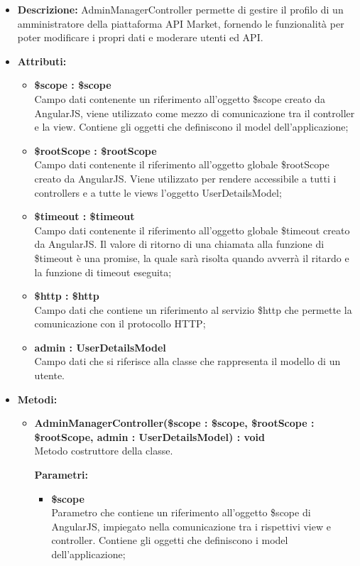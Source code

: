 \begin{itemize}
	\item \textbf{Descrizione:} AdminManagerController permette di gestire il profilo di un amministratore della piattaforma API Market, fornendo le funzionalità per poter modificare i propri dati e moderare utenti ed API.
	\item \textbf{Attributi:}
		\begin{itemize}
		
			\item \textbf{\$scope : \$scope}\\
			Campo dati contenente un riferimento all'oggetto \$scope creato da AngularJS, viene utilizzato come mezzo di comunicazione tra il controller e la view. Contiene gli oggetti che definiscono il model dell'applicazione;
			
			\item \textbf{\$rootScope : \$rootScope}\\
			Campo dati contenente il riferimento all'oggetto globale \$rootScope creato da AngularJS. Viene utilizzato per rendere accessibile a tutti i controllers e a tutte le views l'oggetto UserDetailsModel;
			
			\item \textbf{\$timeout : \$timeout }\\
			Campo dati contenente il riferimento all'oggetto globale \$timeout creato da AngularJS. Il valore di ritorno di una chiamata alla funzione di \$timeout è una promise, la quale sarà risolta quando avverrà il ritardo e la funzione di timeout eseguita;

			\item \textbf{\$http : \$http }\\
			Campo dati che contiene un riferimento al servizio \$http che permette la comunicazione con il protocollo HTTP;
				
			\item \textbf{admin : UserDetailsModel }\\
			Campo dati che si riferisce alla classe che rappresenta il modello di un utente.
				
		\end{itemize}
	\item \textbf{Metodi:}
		\begin{itemize}
		
			\item \textbf{AdminManagerController(\$scope : \$scope, \$rootScope : \$rootScope, admin : UserDetailsModel) : void}\\
			Metodo costruttore della classe.
			\begin{description}
    			\item[\textbf{Parametri:}]
			\end{description}
			\begin{itemize}
				\item \textbf{\$scope}\\
				Parametro che contiene un riferimento all'oggetto \$scope di AngularJS, impiegato nella comunicazione tra i rispettivi view e controller. Contiene gli oggetti che definiscono i model dell'applicazione;
				

\end{itemize}
\end{itemize}
\end{itemize}

